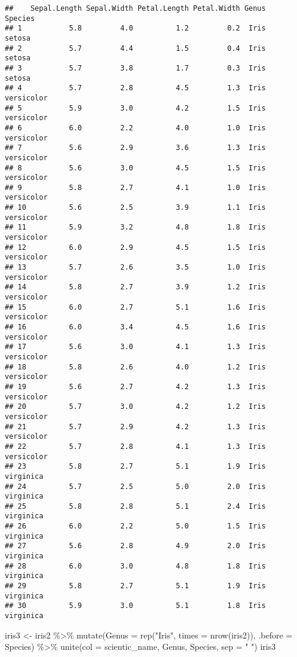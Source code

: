 \documentclass[
]{book}
\newenvironment{Shaded}{\begin{snugshade}}{\end{snugshade}}
\newcommand{\AttributeTok}[1]{\textcolor[rgb]{0.77,0.63,0.00}{#1}}
\newcommand{\FunctionTok}[1]{\textcolor[rgb]{0.00,0.00,0.00}{#1}}
\newcommand{\NormalTok}[1]{#1}
\newcommand{\OtherTok}[1]{\textcolor[rgb]{0.56,0.35,0.01}{#1}}
\newcommand{\SpecialCharTok}[1]{\textcolor[rgb]{0.00,0.00,0.00}{#1}}
\newcommand{\StringTok}[1]{\textcolor[rgb]{0.31,0.60,0.02}{#1}}
\begin{document}
\begin{verbatim}
##    Sepal.Length Sepal.Width Petal.Length Petal.Width Genus    Species
## 1           5.8         4.0          1.2         0.2  Iris     setosa
## 2           5.7         4.4          1.5         0.4  Iris     setosa
## 3           5.7         3.8          1.7         0.3  Iris     setosa
## 4           5.7         2.8          4.5         1.3  Iris versicolor
## 5           5.9         3.0          4.2         1.5  Iris versicolor
## 6           6.0         2.2          4.0         1.0  Iris versicolor
## 7           5.6         2.9          3.6         1.3  Iris versicolor
## 8           5.6         3.0          4.5         1.5  Iris versicolor
## 9           5.8         2.7          4.1         1.0  Iris versicolor
## 10          5.6         2.5          3.9         1.1  Iris versicolor
## 11          5.9         3.2          4.8         1.8  Iris versicolor
## 12          6.0         2.9          4.5         1.5  Iris versicolor
## 13          5.7         2.6          3.5         1.0  Iris versicolor
## 14          5.8         2.7          3.9         1.2  Iris versicolor
## 15          6.0         2.7          5.1         1.6  Iris versicolor
## 16          6.0         3.4          4.5         1.6  Iris versicolor
## 17          5.6         3.0          4.1         1.3  Iris versicolor
## 18          5.8         2.6          4.0         1.2  Iris versicolor
## 19          5.6         2.7          4.2         1.3  Iris versicolor
## 20          5.7         3.0          4.2         1.2  Iris versicolor
## 21          5.7         2.9          4.2         1.3  Iris versicolor
## 22          5.7         2.8          4.1         1.3  Iris versicolor
## 23          5.8         2.7          5.1         1.9  Iris  virginica
## 24          5.7         2.5          5.0         2.0  Iris  virginica
## 25          5.8         2.8          5.1         2.4  Iris  virginica
## 26          6.0         2.2          5.0         1.5  Iris  virginica
## 27          5.6         2.8          4.9         2.0  Iris  virginica
## 28          6.0         3.0          4.8         1.8  Iris  virginica
## 29          5.8         2.7          5.1         1.9  Iris  virginica
## 30          5.9         3.0          5.1         1.8  Iris  virginica
\end{verbatim}

\begin{Shaded}
\begin{Highlighting}[]
\NormalTok{iris3 }\OtherTok{\textless{}{-}}\NormalTok{ iris2 }\SpecialCharTok{\%\textgreater{}\%} 
  \FunctionTok{mutate}\NormalTok{(}\AttributeTok{Genus =} \FunctionTok{rep}\NormalTok{(}\StringTok{"Iris"}\NormalTok{, }\AttributeTok{times =} \FunctionTok{nrow}\NormalTok{(iris2)), }\AttributeTok{.before =}\NormalTok{ Species) }\SpecialCharTok{\%\textgreater{}\%} 
  \FunctionTok{unite}\NormalTok{(}\AttributeTok{col =}\NormalTok{ scientic\_name, Genus, Species, }\AttributeTok{sep =} \StringTok{" "}\NormalTok{)}
\NormalTok{iris3}
\end{Highlighting}
\end{Shaded}
\end{document}
